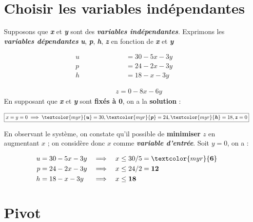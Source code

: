 \documentclass{report}
\newcommand{\Pointilles}[1]{%
  \par\nobreak
  \noindent\rule{0pt}{1.5\baselineskip}%
  \multido{}{#1}{\noindent\makebox[\linewidth]{\dotfill}\endgraf}%
  \bigskip%
}
\begin{document}
\begin{multicols*}{3}
\section{Choisir les variables indépendantes}
Supposons que 
\textcolor{myb}{\textbf{\textit{x}}} et 
\textcolor{myb}{\textbf{\textit{y}}} sont des 
\textcolor{myb}{\textbf{\textit{variables indépendantes}}}. Exprimons 
les \textcolor{myr}{\textbf{\textit{variables dépendantes}}} 
\textcolor{myr}{\textbf{\textit{u}}},
\textcolor{myr}{\textbf{\textit{p}}},
\textcolor{myr}{\textbf{\textit{h}}},
\textcolor{myr}{\textbf{\textit{z}}} en fonction de 
\textcolor{myb}{\textbf{\textit{x}}} et \textcolor{myb}{\textbf{\textit{y}}}


\begin{align*}
    u \quad\quad\quad\quad\quad\quad &= 30 - 5x -3y& \\
    p \quad\quad\quad\quad  &= 24 -2x -3y& \\
    h \quad\quad &= 18 - x -3y&
\end{align*}
\vspace{-2.5em}    
\Pointilles{1}
\vspace{-2.5em}
\begin{align*}
    \quad\quad\quad\;\; z = 0 -8x -6y
\end{align*}
En supposant que 
\textcolor{myb}{\textbf{\textit{x}}} et 
\textcolor{myb}{\textbf{\textit{y}}}  sont \textbf{fixés à 0}, 
on a la \textbf{solution} : 

\begin{align*}
\boxed{x = y = 0 \implies 
\textcolor{myr}{\textbf{\textit{u}}}  = 30, 
\textcolor{myr}{\textbf{\textit{p}}} = 24,
\textcolor{myr}{\textbf{\textit{h}}} = 18,
\textbf{\textit{z}} = 0}
\end{align*}

En observant le système, on constate qu'il possible de 
\textbf{minimiser} $z$ en augmentant $x$ ; on considère 
donc $x$ comme \textcolor{myb}{\textbf{\textit{variable d'entrée}}}. Soit 
$y = 0$, on a :

\begin{align*}
    u &= 30 - 5x -3y& 
    \implies \quad 
    & x \leq 30/5 = \textcolor{myr}{\textbf{6}}  
    \\
    p &= 24 -2x -3y 
    & \implies \quad  &  x \leq 24/2 = \textbf{12}  
    \\
    h &= 18 - x -3y&
    \implies \quad & x \leq \textbf{18}  
\end{align*}


\section{Pivot}


\end{multicols*}
\end{document}

